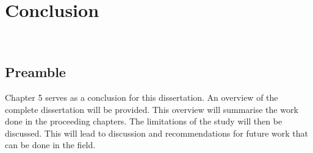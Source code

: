 \chapter{Conclusion}
\vspace{38em}

\hrulefill
\\
\newpage
		\section{Preamble}
		Chapter 5 serves as a conclusion for this dissertation. An overview of the complete dissertation will be provided. This overview will summarise the work done in the proceeding chapters. The limitations of the study will then be discussed. This will lead to discussion and recommendations for future work that can be done in the field.
